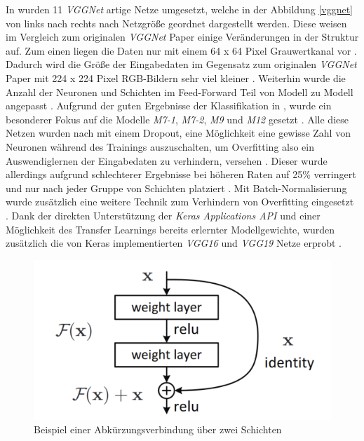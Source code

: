 \documentclass[twoside,a4paper]{IEEEtran}
\begin{document}
In \cite{RHC} wurden 11 \emph{VGGNet} artige Netze umgesetzt, welche in der Abbildung \ref{vggnet} von links nach rechts nach Netzgröße geordnet dargestellt werden. Diese weisen im Vergleich zum originalen \emph{VGGNet} Paper einige Veränderungen in der Struktur auf. Zum einen liegen die Daten nur mit einem 64 x 64 Pixel Grauwertkanal vor \cite[S.3]{RHC}. Dadurch wird die Größe der Eingabedaten im Gegensatz zum originalen \emph{VGGNet} Paper mit 224 x 224 Pixel RGB-Bildern sehr viel kleiner \cite[S.2]{simonyan2015deep}. Weiterhin wurde die Anzahl der Neuronen und Schichten im Feed-Forward Teil von Modell zu Modell angepasst \cite[S.3]{RHC}. Aufgrund der guten Ergebnisse der Klassifikation in \cite{RHC}, wurde ein besonderer Fokus auf die Modelle \emph{M7-1}, \emph{M7-2}, \emph{M9} und \emph{M12} gesetzt \cite[S.5]{RHC}. Alle diese Netzen wurden nach \cite{RHC} mit einem Dropout, eine Möglichkeit eine gewisse Zahl von Neuronen während des Trainings auszuschalten, um Overfitting also ein Auswendiglernen der Eingabedaten zu verhindern, versehen \cite[S.306-307]{MACHINE_LEARNING}. Dieser wurde allerdings aufgrund schlechterer Ergebnisse bei höheren Raten auf 25\% verringert und nur nach jeder Gruppe von Schichten platziert \cite[S.2]{RHC}. Mit Batch-Normalisierung wurde zusätzlich eine weitere Technik zum Verhindern von Overfitting eingesetzt \cite[S.282-283]{MACHINE_LEARNING}. Dank der direkten Unterstützung der \emph{Keras Applications API} und einer Möglichkeit des Transfer Learnings bereits erlernter Modellgewichte, wurden zusätzlich die von Keras implementierten \emph{VGG16} und \emph{VGG19} Netze erprobt \cite{vgg_keras}.

\begin{figure}[!htb]
	\includegraphics[width=\columnwidth]{residual}
	\caption{Beispiel einer Abkürzungsverbindung über zwei Schichten \cite[S.2]{resnet}}
	\label{res}
\end{figure}
\end{document}
